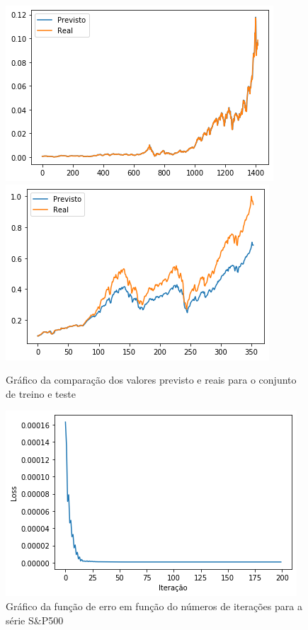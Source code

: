 \documentclass[
    12pt,
    oneside,
    a4paper,
    english,
    brazil
]{abntex2}
\begin{document}
\begin{figure}[ht]
    \centering
    \caption{Gráfico da comparação dos valores previsto e reais para o conjunto de treino e teste}\label{fig:sp500_overfit}
        \includegraphics[width=\linewidth]{images/sp500_overfit_train.png}
    \endminipage\hfill
        \includegraphics[width=\linewidth]{images/sp500_overfit_test.png}
    \endminipage\hfill
\end{figure}

\begin{figure}[ht]
    \centering
    \caption{Gráfico da função de erro em  função do números de iterações para
    a série S\&P500}\label{fig:iter_sp500_overfit}
    \includegraphics[width=.5\linewidth]{images/sp500_overfit_iter.png}
\end{figure}
\end{document}
